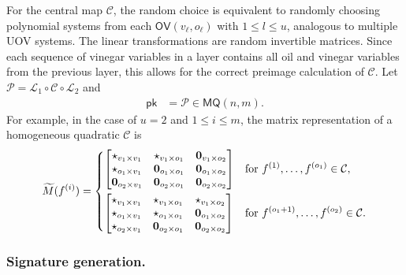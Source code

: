 \documentclass[english]{ufsc-thesis-rn46-2019/ufsc-thesis-rn46-2019}
\theoremstyle{definition}
\begin{document}
For the central map $\mathcal{C}$, the random choice is equivalent to randomly
choosing polynomial systems from each $\mathsf{OV}(v_{\ell}, o_{\ell})$ with
$1 \leq l \leq u$, analogous to multiple UOV systems. The linear
transformations are random invertible matrices. Since each sequence of vinegar
variables in a layer contains all oil and vinegar variables from the previous
layer, this allows for the correct preimage calculation of $\mathcal{C}$. Let
$\mathcal{P} = \mathcal{L}_{1} \circ \mathcal{C} \circ \mathcal{L}_{2}$ and
\begin{align}\label{eq:pk-rainbow}
  \mathsf{pk} & = \mathcal{P} \in \mathsf{MQ}(n, m).
\end{align}
For example, in the case of $u = 2$ and $1 \leq i \leq m$, the matrix
representation of a homogeneous quadratic $\mathcal{C}$ is
\begin{align}
  \widetilde{M}(f^{(i)}) =
  \begin{dcases}
    \begin{bmatrix}
      \star_{v_{1} \times v_{1}}      & \star_{v_{1} \times o_{1}}
        & \mathbf{0}_{v_{1} \times o_{2}} \\
      \star_{o_{1} \times v_{1}}      & \mathbf{0}_{o_{1} \times o_{1}}
        & \mathbf{0}_{o_{1} \times o_{2}} \\
      \mathbf{0}_{o_{2} \times v_{1}} & \mathbf{0}_{o_{2} \times o_{1}}
        & \mathbf{0}_{o_{2} \times o_{2}} \\
    \end{bmatrix}
      & \text{for } f^{(1)}, \dots, f^{(o_{1})} \in \mathcal{C}, \\
    \begin{bmatrix}
      \star_{v_{1} \times v_{1}} & \star_{v_{1} \times o_{1}}
        & \star_{v_{1} \times o_{2}}      \\
      \star_{o_{1} \times v_{1}} & \star_{o_{1} \times o_{1}}
        & \mathbf{0}_{o_{1} \times o_{2}} \\
      \star_{o_{2} \times v_{1}} & \mathbf{0}_{o_{2} \times o_{1}}
        & \mathbf{0}_{o_{2} \times o_{2}} \\
    \end{bmatrix}
      & \text{for } f^{(o_{1} + 1)}, \dots, f^{(o_{2})} \in \mathcal{C}.
  \end{dcases}
\end{align}

\subsubsection{Signature generation.}
\end{document}

